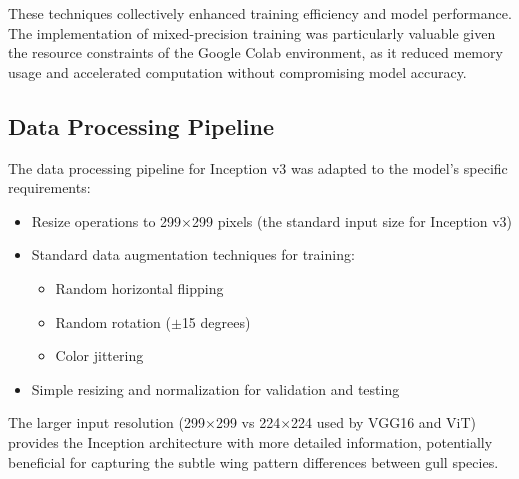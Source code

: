 These techniques collectively enhanced training efficiency and model performance. The implementation of mixed-precision training was particularly valuable given the resource constraints of the Google Colab environment, as it reduced memory usage and accelerated computation without compromising model accuracy.

\subsection{Data Processing Pipeline}

The data processing pipeline for Inception v3 was adapted to the model's specific requirements:

\begin{itemize}
    \item Resize operations to 299$\times$299 pixels (the standard input size for Inception v3)
    \item Standard data augmentation techniques for training:
    \begin{itemize}
        \item Random horizontal flipping
        \item Random rotation ($\pm$15 degrees)
        \item Color jittering
    \end{itemize}
    \item Simple resizing and normalization for validation and testing
\end{itemize}

The larger input resolution (299$\times$299 vs 224$\times$224 used by VGG16 and ViT) provides the Inception architecture with more detailed information, potentially beneficial for capturing the subtle wing pattern differences between gull species.

